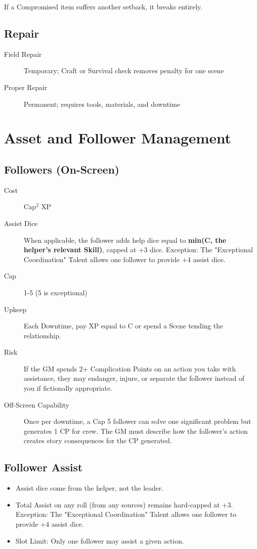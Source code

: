 If a Compromised item suffers another setback, it breaks entirely.

\subsection{Repair}

\begin{description}
\item[Field Repair] Temporary; Craft or Survival check removes penalty for one scene
\item[Proper Repair] Permanent; requires tools, materials, and downtime
\end{description}

\section{Asset and Follower Management}

\subsection{Followers (On-Screen)}

\begin{description}
\item[Cost] Cap$^2$ XP
\item[Assist Dice] When applicable, the follower adds help dice equal to \textbf{min(C, the helper's relevant Skill)}, capped at +3 dice. Exception: The "Exceptional Coordination" Talent allows one follower to provide +4 assist dice.
\item[Cap] 1-5 (5 is exceptional)
\item[Upkeep] Each Downtime, pay XP equal to C or spend a Scene tending the relationship.
\item[Risk] If the GM spends 2+ Complication Points on an action you take with assistance, they may endanger, injure, or separate the follower instead of you if fictionally appropriate.
\item[Off-Screen Capability] Once per downtime, a Cap 5 follower can solve one significant problem but generates 1 CP for crew. The GM must describe how the follower's action creates story consequences for the CP generated.
\end{description}

\subsection{Follower Assist}
\begin{itemize}
    \item Assist dice come from the helper, not the leader.
    \item Total Assist on any roll (from any sources) remains hard-capped at +3. Exception: The "Exceptional Coordination" Talent allows one follower to provide +4 assist dice.
    \item Slot Limit: Only one follower may assist a given action.
\end{itemize}

